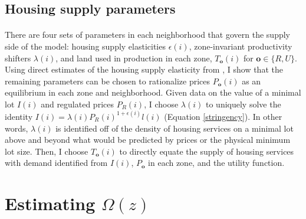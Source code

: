 \documentclass[11pt]{article}
\begin{document}
\subsection{Housing supply parameters}
\paragraph*{}
There are four sets of parameters in each neighborhood that govern the supply side of the model: housing supply elasticities $\epsilon(i)$, zone-invariant productivity shifters $\lambda(i)$, and land used in production in each zone, $T_{\boldsymbol{o}}(i)$ for $\boldsymbol{o} \in \{R, U\}$. Using direct estimates of the housing supply elasticity from \cite{BSH}, I show that the remaining parameters can be chosen to rationalize prices $P_{\boldsymbol{o}}(i)$ as an equilibrium in each zone and neighborhood. Given data on the value of a minimal lot $I(i)$ and regulated prices $P_{R}(i)$, I choose $\lambda(i)$ to uniquely solve the identity $I(i) = \lambda(i)P_{R}(i)^{1 + \epsilon(i)}l(i)$ (Equation \ref{stringency}). In other words, $\lambda(i)$ is identified off of the density of housing services on a minimal lot above and beyond what would be predicted by prices or the physical minimum lot size. Then, I choose $T_{\boldsymbol{o}}(i)$ to directly equate the supply of housing services with demand identified from $I(i)$, $P_{\boldsymbol{o}}$ in each zone, and the utility function. 









\section{Estimating $\Omega(z)$}\label{Section:EstNeighborhoodChoice}
\end{document}
